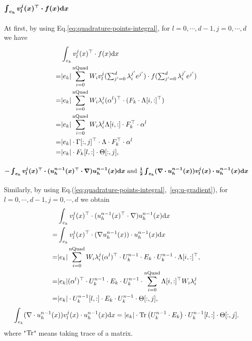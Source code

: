 \paragraph{$\bm{\int_{e_k}v^j_l(x)^\top\cdot f(x)\mathrm{d} x}$}
At first, by using Eq.\eqref{eq:quadrature-points-integral}, for $l=0,\cdots,d-1,j=0,\cdots,d$ we have 
\begin{equation}
  \begin{split}
    &\int_{e_k}v^j_l(x)^\top\cdot f(x)\mathrm{d} x \\
    =&|e_k|\sum_{i=0}^{\text{nQuad}}
    {\textstyle W_iv^j_l(\sum_{j'=0}^{d}\lambda_i^{j'}e^{j'})\cdot f(\sum_{j'=0}^{d}\lambda_i^{j'}e^{j'})} \\
    =& |e_k|\sum_{i=0}^{\text{nQuad}}W_i\lambda_i^j(\alpha^l)^\top\cdot (F_k\cdot\Lambda[i,:]^\top) \\
    =& |e_k|\sum_{i=0}^{\text{nQuad}}W_i\lambda_i^j\Lambda[i,:]\cdot F_k^\top\cdot\alpha^l \\
    =& |e_k|\cdot\Gamma[:,j]^\top\cdot\Lambda\cdot F_k^\top\cdot\alpha^l \\
    =& |e_k|\cdot F_k[l,:]\cdot\Theta[:,j],
  \end{split}
\end{equation}

\paragraph{$\bm{-\int_{e_k}v^j_l(x)^\top\cdot(u_h^{n-1}(x)^\top\cdot\nabla)u_h^{n-1}(x)\mathrm{d} x\text{ and }
  \frac{1}{2}\int_{e_k}(\nabla\cdot u_h^{n-1}(x))v^j_l(x)\cdot u_h^{n-1}(x)\mathrm{d} x}$}
Similarly, by using Eq.(\ref{eq:quadrature-points-integral},~\ref{eq:u-gradient}), for $l=0,\cdots,d-1,j=0,\cdots,d$ we obtain
\begin{equation}
  \begin{split}
    &\int_{e_k}v^j_l(x)^\top\cdot(u_h^{n-1}(x)^\top\cdot\nabla)u_h^{n-1}(x)\mathrm{d} x \\
    =& \int_{e_k}v^j_l(x)^\top\cdot(\nabla u_h^{n-1}(x))\cdot u_h^{n-1}(x)\mathrm{d} x \\ 
    =& |e_k|\sum_{i=0}^{\text{nQuad}}W_i\lambda_i^j(\alpha^l)^\top
    \cdot U_k^{n-1}\cdot E_k
    \cdot U_k^{n-1}\cdot \Lambda[i,:]^\top, \\
    =& |e_k|(\alpha^l)^\top\cdot U_k^{n-1}\cdot E_k\cdot U_k^{n-1}\cdot
    \sum_{i=0}^{\text{nQuad}}\Lambda[i,:]^\top W_i\lambda_i^j \\
    =& |e_k|\cdot U_k^{n-1}[l,:]\cdot E_k\cdot U_k^{n-1}\cdot\Theta[:,j], 
  \end{split}
\end{equation}
\begin{equation}
  \int_{e_k}(\nabla\cdot u_h^{n-1}(x))v^j_l(x)\cdot u_h^{n-1}(x)\mathrm{d} x
  =|e_k|\cdot\operatorname*{Tr}\big(U_k^{n-1}\cdot E_k\big)\cdot
  U_k^{n-1}[l,:]\cdot\Theta[:,j].
\end{equation}
where "$\operatorname*{Tr}$" means taking trace of a matrix.

